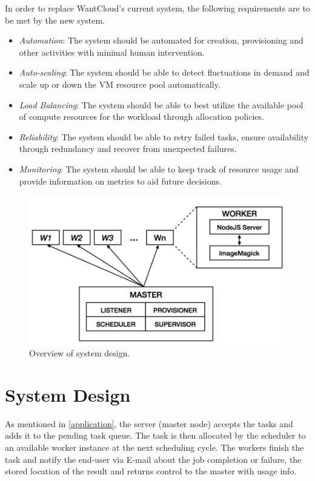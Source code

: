 \documentclass[a4paper]{IEEEtran}
\begin{document}
In order to replace WantCloud's current system, the following requirements are to be met by the new system.

\begin{itemize}
  \item \emph{Automation}: The system should be automated for creation, provisioning and other activities
  with minimal human intervention.
  \item \emph{Auto-scaling}: The system should be able to detect fluctuations in demand and scale up or down the VM resource pool automatically.
  \item \emph{Load Balancing}: The system should be able to best utilize the available pool of compute resources
  for the workload through allocation policies.
  \item \emph{Reliability}: The system should be able to retry failed tasks, ensure availability through redundancy and recover from unexpected failures.
  \item \emph{Monitoring}: The system should be able to keep track of resource usage and provide information
  on metrics to aid future decisions.
\end{itemize}

\begin{figure}[tbp]
  \centering
    \includegraphics[width=\columnwidth]{system-design.png}
  \caption{Overview of system design.}
  \label{fig:overview_system_design}
\end{figure}

\section{System Design} \label{system_design}

As mentioned in \autoref{application}, the server (master node) accepts the tasks and adds it to the pending task queue. The task is then allocated by the scheduler to an available worker instance at the next scheduling cycle. The workers finish the task and notify the end-user via E-mail about the job completion or failure, the stored location of the result and returns control to the master with usage info.
\end{document}
